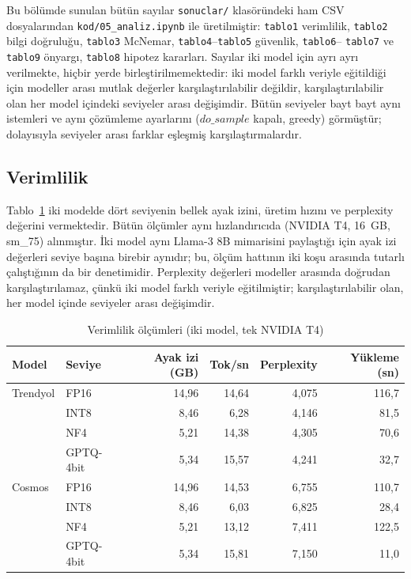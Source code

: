 \documentclass[conference]{IEEEtran}
\begin{document}
Bu bölümde sunulan bütün sayılar \texttt{sonuclar/} klasöründeki ham CSV
dosyalarından \texttt{kod/05\_analiz.ipynb} ile üretilmiştir:
\texttt{tablo1} verimlilik, \texttt{tablo2} bilgi doğruluğu, \texttt{tablo3}
McNemar, \texttt{tablo4}--\texttt{tablo5} güvenlik, \texttt{tablo6}--%
\texttt{tablo7} ve \texttt{tablo9} önyargı, \texttt{tablo8} hipotez
kararları. Sayılar iki model için ayrı ayrı verilmekte, hiçbir yerde
birleştirilmemektedir: iki model farklı veriyle eğitildiği için modeller arası
mutlak değerler karşılaştırılabilir değildir, karşılaştırılabilir olan her
model içindeki seviyeler arası değişimdir. Bütün seviyeler bayt bayt aynı
istemleri ve aynı çözümleme ayarlarını ($do\_sample$ kapalı, greedy)
görmüştür; dolayısıyla seviyeler arası farklar eşleşmiş
karşılaştırmalardır.

\subsection{Verimlilik}
\label{sec:verimlilik}

Tablo~\ref{tab:verimlilik} iki modelde dört seviyenin bellek ayak izini,
üretim hızını ve perplexity değerini vermektedir. Bütün ölçümler aynı
hızlandırıcıda (NVIDIA T4, 16~GB, sm\_75) alınmıştır. İki model aynı Llama-3
8B mimarisini paylaştığı için ayak izi değerleri seviye başına birebir aynıdır;
bu, ölçüm hattının iki koşu arasında tutarlı çalıştığının da bir denetimidir.
Perplexity değerleri modeller arasında doğrudan karşılaştırılamaz, çünkü iki
model farklı veriyle eğitilmiştir; karşılaştırılabilir olan, her model içinde
seviyeler arası değişimdir.

\begin{table}[htbp]
\caption{Verimlilik ölçümleri (iki model, tek NVIDIA T4)}
\label{tab:verimlilik}
\centering
\small
\setlength{\tabcolsep}{4pt}
\begin{tabular}{llrrrr}
\hline
Model & Seviye & Ayak izi (GB) & Tok/sn & Perplexity & Yükleme (sn) \\
\hline
Trendyol & FP16      & 14,96 & 14,64 & 4,075 & 116,7 \\
         & INT8      & 8,46  & 6,28  & 4,146 & 81,5 \\
         & NF4       & 5,21  & 14,38 & 4,305 & 70,6 \\
         & GPTQ-4bit & 5,34  & 15,57 & 4,241 & 32,7 \\
\hline
Cosmos   & FP16      & 14,96 & 14,53 & 6,755 & 110,7 \\
         & INT8      & 8,46  & 6,03  & 6,825 & 28,4 \\
         & NF4       & 5,21  & 13,12 & 7,411 & 122,5 \\
         & GPTQ-4bit & 5,34  & 15,81 & 7,150 & 11,0 \\
\hline
\end{tabular}
\end{table}
\end{document}

